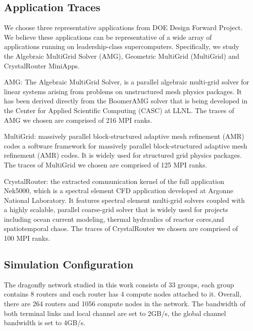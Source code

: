 \documentclass[conference,compsoc]{IEEEtran}
\begin{document}
\subsection{Application Traces}
\label{sec: application traces}

We choose three representative applications from DOE Design Forward Project\cite{designforwardwebpage}. We believe these applications can be representative of a wide array of applications running on leadership-class supercomputers. Specifically, we study the Algebraic MultiGrid Solver (AMG), Geometric MultiGrid (MultiGrid) and CrystalRouter MiniApps. 

AMG: The Algebraic MultiGrid Solver, is a parallel algebraic multi-grid solver for linear systems arising from problems on unstructured mesh physics packages. It has been derived directly from the BoomerAMG solver that is being developed in the Center for Applied Scientific Computing (CASC) at LLNL\cite{amg}. The traces of AMG we chosen are comprised of 216 MPI ranks.

MultiGrid: massively parallel block-structured adaptive mesh refinement (AMR) codes a software framework for massively parallel block-structured adaptive mesh refinement (AMR) codes\cite{boxlib}. It is widely used for structured grid physics packages. The traces of MultiGrid we chosen are comprised of 125 MPI ranks.

CrystalRouter: the extracted communication kernel of the full application Nek5000\cite{nek5000}, which is a spectral element CFD application developed at Argonne National Laboratory\cite{crystalrouter}. It features spectral element multi-grid solvers coupled with a highly scalable, parallel coarse-grid solver that is widely used for projects including ocean current modeling, thermal hydraulics of reactor cores,and spatiotemporal chaos. The traces of CrystalRouter we chosen are comprised of 100 MPI ranks.



\subsection{Simulation Configuration}
\label{sec: simulation configuration}

The dragonfly network studied in this work consists of 33 groups, each group contains 8 routers and each router has 4 compute nodes attached to it. Overall, there are 264 routers and 1056 compute nodes in the network. The bandwidth of both terminal links and local channel are set to 2GB/s, the global channel bandwidth is set to 4GB/s. 
\end{document}
